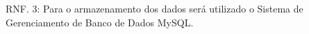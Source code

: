 \documentclass[12pt,a4paper,onecolumn,titlepage]{article}
\begin{document}
RNF. 3: Para o armazenamento dos dados será utilizado o Sistema de Gerenciamento de Banco de Dados MySQL.\\





  
  

\renewcommand{\contentsname}{Índice}
\tableofcontents


%
%
\end{document}
